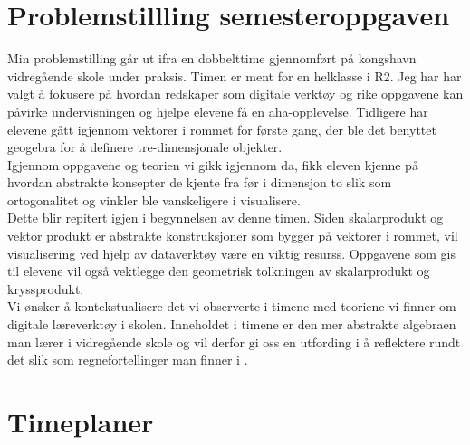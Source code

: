 \documentclass{article}
\date{}
\title{}
\begin{document}
\section*{Problemstillling semesteroppgaven}
\label{sec-1}
Min problemstilling går ut ifra en dobbelttime gjennomført på kongshavn vidregående skole under praksis.
Timen er ment for en helklasse i R2. Jeg har har valgt å fokusere på hvordan redskaper som 
digitale verktøy  og rike oppgavene kan påvirke undervisningen og hjelpe elevene få en aha-opplevelse.
Tidligere har elevene gått igjennom vektorer i rommet for første gang, der ble det benyttet geogebra
for å definere tre-dimensjonale objekter.\\
Igjennom oppgavene og teorien vi gikk igjennom da, fikk eleven kjenne på hvordan abstrakte konsepter de 
kjente fra før i dimensjon to slik som ortogonalitet og vinkler ble vanskeligere i visualisere.\\
Dette blir repitert igjen i begynnelsen av denne timen. Siden skalarprodukt og vektor produkt er abstrakte konstruksjoner som bygger på vektorer i rommet,
 vil visualisering ved hjelp av dataverktøy være en viktig resurss. Oppgavene som gis til elevene vil også vektlegge den geometrisk tolkningen av skalarprodukt og kryssprodukt.\\

Vi ønsker å kontekstualisere det vi observerte i timene med teoriene vi finner \cite{digital} om digitale læreverktøy i skolen.
Inneholdet i timene er den mer abstrakte algebraen man lærer i vidregående skole og vil derfor gi oss en utfording i å reflektere rundt det slik som regnefortellinger man finner i  \cite{alg}.
\newpage
\section*{Timeplaner}
\label{sec-2}
\end{document}
